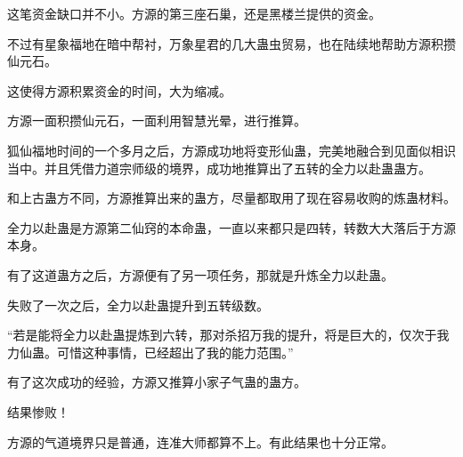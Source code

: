 \begin{this_body}
这笔资金缺口并不小。方源的第三座石巢，还是黑楼兰提供的资金。

不过有星象福地在暗中帮衬，万象星君的几大蛊虫贸易，也在陆续地帮助方源积攒仙元石。

这使得方源积累资金的时间，大为缩减。

方源一面积攒仙元石，一面利用智慧光晕，进行推算。

狐仙福地时间的一个多月之后，方源成功地将变形仙蛊，完美地融合到见面似相识当中。并且凭借力道宗师级的境界，成功地推算出了五转的全力以赴蛊蛊方。

和上古蛊方不同，方源推算出来的蛊方，尽量都取用了现在容易收购的炼蛊材料。

全力以赴蛊是方源第二仙窍的本命蛊，一直以来都只是四转，转数大大落后于方源本身。

有了这道蛊方之后，方源便有了另一项任务，那就是升炼全力以赴蛊。

失败了一次之后，全力以赴蛊提升到五转级数。

“若是能将全力以赴蛊提炼到六转，那对杀招万我的提升，将是巨大的，仅次于我力仙蛊。可惜这种事情，已经超出了我的能力范围。”

有了这次成功的经验，方源又推算小家子气蛊的蛊方。

结果惨败！

方源的气道境界只是普通，连准大师都算不上。有此结果也十分正常。

\end{this_body}


